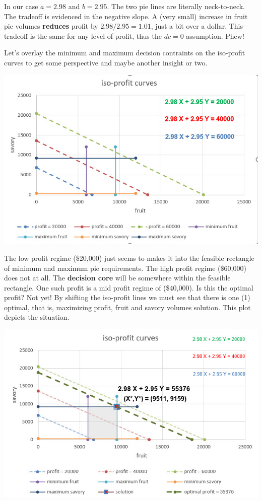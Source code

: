 \documentclass[
]{book}
\begin{document}
In our case \(a = 2.98\) and \(b = 2.95\). The two pie lines are literally neck-to-neck. The tradeoff is evidenced in the negative slope. A (very small) increase in fruit pie volumes \textbf{reduces} profit by \(2.98 / 2.95 = 1.01\), just a bit over a dollar. This tradeoff is the same for any level of profit, thus the \(dc=0\) assumption. Phew!

Let's overlay the minimum and maximum decision contraints on the iso-profit curves to get some perspective and maybe another insight or two.

\includegraphics{images/03/pie-2-products-iso-profit-minmax-decision.jpg}

The low profit regime (\$20,000) just seems to makes it into the feasible rectangle of minimum and maximum pie requirements. The high profit regime (\$60,000) does not at all. The \textbf{decision core} will be somewhere within the feasible rectangle. One such profit is a mid profit regime of (\$40,000). Is this the optimal profit? Not yet! By shifting the iso-profit lines we must see that there is one (1) optimal, that is, maximizing profit, fruit and savory volumes solution. This plot depicts the situation.

\includegraphics{images/03/pie-2-product-iso-profit-min-max-solution.jpg}
\end{document}
